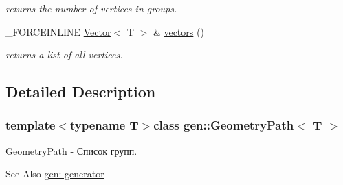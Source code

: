 \begin{DoxyCompactItemize}
\begin{DoxyCompactList}\small\item\em returns the number of vertices in groups. \end{DoxyCompactList}\item 
\hypertarget{classgen_1_1_geometry_path_ac50a055162b650be01e9f3424270e7d4}{\-\_\-\-F\-O\-R\-C\-E\-I\-N\-L\-I\-N\-E \hyperlink{classbt_1_1_vector}{Vector}$<$ T $>$ \& \hyperlink{classgen_1_1_geometry_path_ac50a055162b650be01e9f3424270e7d4}{vectors} ()}\label{classgen_1_1_geometry_path_ac50a055162b650be01e9f3424270e7d4}

\begin{DoxyCompactList}\small\item\em returns a list of all vertices. \end{DoxyCompactList}\end{DoxyCompactItemize}


\subsection{Detailed Description}
\subsubsection*{template$<$typename T$>$class gen\-::\-Geometry\-Path$<$ T $>$}

\hyperlink{classgen_1_1_geometry_path}{Geometry\-Path} -\/ Список групп. 

\begin{DoxySeeAlso}{See Also}
\hyperlink{group__generator}{gen\-: generator} 
\end{DoxySeeAlso}
